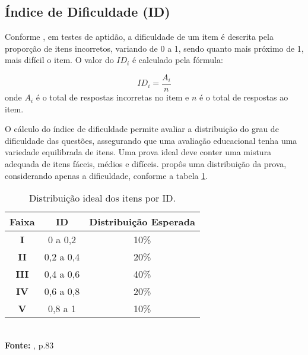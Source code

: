 \subsection{Índice de Dificuldade (ID)}

Conforme , em testes de aptidão, a dificuldade de um item é descrita pela proporção de itens incorretos, variando de 0 a 1, sendo quanto mais próximo de 1, mais difícil o item. O valor do $ID_i$ é calculado  pela fórmula: 

\[
	ID_i =\dfrac{A_i}{n} 
\]
onde $A_i$ é o total de respostas incorretas no item e $n$ é o total de respostas ao item. 

\begin{comment}
O calculo do índice de dificuldade é importante pois permite conhecer a distribuição do grau de dificuldade das questões que segundo \citeonline{pasquali2003}, para que uma avaliação educacional tenha um nível de dificuldade ideal, os índices devem seguir uma distribuição próxima à curva normal, com itens fáceis, médios e difíceis.
\end{comment}

O cálculo do índice de dificuldade permite avaliar a distribuição do grau de dificuldade das questões, assegurando que uma avaliação educacional tenha uma variedade equilibrada de itens.  Uma prova ideal deve conter uma mistura adequada de itens fáceis, médios e difíceis.  propôs uma distribuição da prova, considerando apenas a dificuldade, conforme a tabela \ref{tabela-class-ID}.


\begin{table}[H]
		\centering
		\caption{Distribuição ideal dos itens por ID.}
		\label{tabela-class-ID}
		\begin{tabular}{ccc}
			\hline
			\textbf{Faixa} & \textbf{ID}  &	  \textbf{Distribuição Esperada}   \\ 
			\hline
			\textbf{I}  & 0 a 0,2 & 10\%   \\ 
			\hline
			\textbf{II} & 0,2 a 0,4 &  20\%   \\
			\hline
			\textbf{III} & 0,4 a 0,6 &  40\%   \\ 
			\hline
			\textbf{IV} & 0,6 a 0,8 &  20\%   \\ 
			\hline
			\textbf{V} & 0,8 a 1 & 10\%   \\ 
			\hline
		\end{tabular}\\
		\vspace*{0.5cm}
		\small{\textbf{Fonte:} , p.83}
\end{table}

